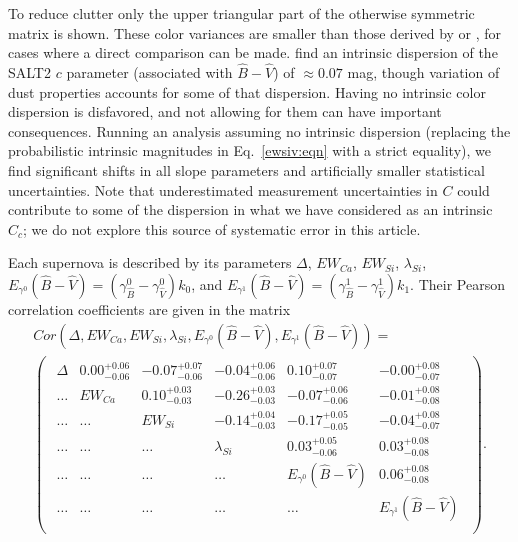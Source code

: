 \documentclass{aastex61}   	%
\begin{document}
To reduce clutter only the upper triangular part of the otherwise symmetric matrix is shown.
These color variances are smaller than those derived by \citet{2003A&A...404..901N} or \citet{2007ApJ...659..122J}, for cases where
a direct comparison can be made.
  find an intrinsic dispersion of the SALT2 $c$ parameter (associated with ${\hat{B}}-{\hat{V}}$) of $\approx 0.07$ mag,
though variation of dust properties accounts for some of that dispersion.
Having no intrinsic color dispersion is disfavored, and not allowing for them can have important consequences.  Running an analysis assuming no intrinsic dispersion (replacing the probabilistic intrinsic magnitudes in Eq.~\ref{ewsiv:eqn}
with a strict equality), we find significant shifts in all slope parameters  and 
artificially
smaller statistical uncertainties.
\color{red}
Note that underestimated measurement uncertainties in $C$ could contribute to some of the dispersion in what we have considered as an intrinsic
$C_c$; we do not explore this source of systematic error in this article.
\color{black}

Each supernova is described by its parameters $\Delta$, $EW_{Ca}$, $EW_{Si}$, $\lambda_{Si}$,
$E_{\gamma^0}({\hat{B}}-{\hat{V}})=(\gamma^0_{\hat{B}}-\gamma^0_{\hat{V}})k_0$, and $E_{\gamma^1}({\hat{B}}-{\hat{V}})=(\gamma^1_{\hat{B}}-\gamma^1_{\hat{V}})k_1$.
Their Pearson correlation coefficients  are given in the matrix
\begin{multline}
Cor(\Delta, EW_{Ca}, EW_{Si}, \lambda_{Si}, E_{\gamma^0}({\hat{B}}-{\hat{V}}), E_{\gamma^1}({\hat{B}}-{\hat{V}})) =\\
\begin{pmatrix}
\begin{array}{rrrrrr}
\Delta & 0.00^{+0.06}_{-0.06} & -0.07^{+0.07}_{-0.06} & -0.04^{+0.06}_{-0.06} & 0.10^{+0.07}_{-0.07} & -0.00^{+0.08}_{-0.07} \\
\ldots  &EW_{Ca} & 0.10^{+0.03}_{-0.03} & -0.26^{+0.03}_{-0.03} & -0.07^{+0.06}_{-0.06} & -0.01^{+0.08}_{-0.08} \\
\ldots  & \ldots &  EW_{Si} & -0.14^{+0.04}_{-0.03} & -0.17^{+0.05}_{-0.05} & -0.04^{+0.08}_{-0.07} \\
\ldots & \ldots  &\ldots  & \lambda_{Si} & 0.03^{+0.05}_{-0.06} & 0.03^{+0.08}_{-0.08} \\
\ldots & \ldots & \ldots & \ldots & E_{\gamma^0}({\hat{B}}-{\hat{V}}) & 0.06^{+0.08}_{-0.08} \\
\ldots &\ldots  & \ldots  &\ldots & \ldots & E_{\gamma^1}({\hat{B}}-{\hat{V}}) \\
\end{array}
\end{pmatrix}.
\end{multline}
\end{document}

